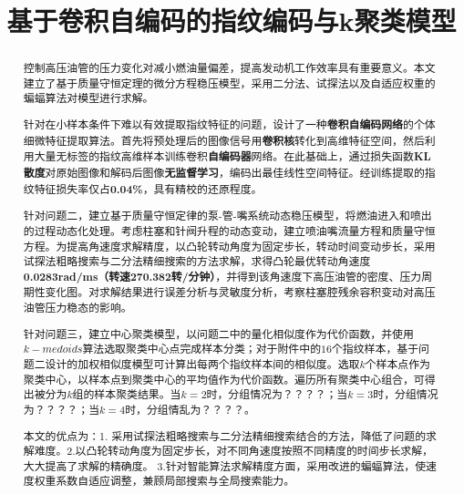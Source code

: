 \documentclass{whutmod}
\title{基于卷积自编码的指纹编码与k聚类模型}
\begin{document}
	\maketitle
	\thispagestyle{empty}
	\begin{abstract}
		控制高压油管的压力变化对减小燃油量偏差，提高发动机工作效率具有重要意义。本文建立了基于质量守恒定理的微分方程稳压模型，采用二分法、试探法以及自适应权重的蝙蝠算法对模型进行求解。

	
		
		针对在小样本条件下难以有效提取指纹特征的问题，设计了一种\textbf{卷积自编码网络}的个体细微特征提取算法。首先将预处理后的图像信号用\textbf{卷积核}转化到高维特征空间，然后利用大量无标签的指纹高维样本训练卷积\textbf{自编码器}网络。在此基础上，通过损失函数\textbf{KL散度}对原始图像和解码后图像\textbf{无监督学习}，编码出最佳线性空间特征。经训练提取的指纹特征损失率仅占\textbf{0.04\%}，具有精校的还原程度。
		
		
		针对问题二，建立基于质量守恒定律的泵-管-嘴系统动态稳压模型，将燃油进入和喷出的过程动态化处理。考虑柱塞和针阀升程的动态变动，建立喷油嘴流量方程和质量守恒方程。为提高角速度求解精度，以凸轮转动角度为固定步长，转动时间变动步长，采用试探法粗略搜索与二分法精细搜索的方法求解，求得凸轮最优转动角速度\textbf{0.0283rad/ms（转速270.382转/分钟）}，并得到该角速度下高压油管的密度、压力周期性变化图。对求解结果进行误差分析与灵敏度分析，考察柱塞腔残余容积变动对高压油管压力稳态的影响。
		
		针对问题三，建立中心聚类模型，以问题二中的量化相似度作为代价函数，并使用$k-medoids$算法选取聚类中心点完成样本分类；对于附件中的$16$个指纹样本，基于问题二设计的加权相似度模型可计算出每两个指纹样本间的相似度。选取$k$个样本点作为聚类中心，以样本点到聚类中心的平均值作为代价函数。遍历所有聚类中心组合，可得出被分为$k$组的样本聚类结果。当$k=2$时，分组情况为？？？？；当$k=3$时，分组情况为？？？？；当$k=4$时，分组情乱为？？？？。
		
		
		本文的优点为：1. 采用试探法粗略搜索与二分法精细搜索结合的方法，降低了问题的求解难度。2.以凸轮转动角度为固定步长，对不同角速度按照不同精度的时间步长求解，大大提高了求解的精确度。 3.针对智能算法求解精度方面，采用改进的蝙蝠算法，使速度权重系数自适应调整，兼顾局部搜索与全局搜索能力。
		
	\end{abstract}


	\thispagestyle{empty}
	\tableofcontents
		\thispagestyle{empty}
	\setcounter{page}{0}                                               
	\newpage	%
	
\end{document}
